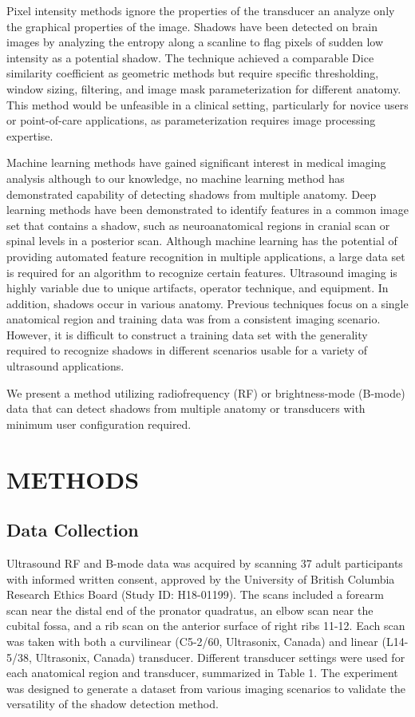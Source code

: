 \documentclass[preprint,5p]{elsarticle}
\begin{document}
Pixel intensity methods ignore the properties of the transducer an analyze only the graphical properties of the image. Shadows have been detected on brain images by analyzing the entropy along a scanline to flag pixels of sudden low intensity as a potential shadow. The technique achieved a comparable Dice similarity coefficient as geometric methods but require specific thresholding, window sizing, filtering, and image mask parameterization for different anatomy. This method would be unfeasible in a clinical setting, particularly for novice users or point-of-care applications, as parameterization requires image processing expertise.

Machine learning methods have gained significant interest in medical imaging analysis although to our knowledge, no machine learning method has demonstrated capability of detecting shadows from multiple anatomy. Deep learning methods have been demonstrated to identify features in a common image set that contains a shadow, such as neuroanatomical regions in cranial scan or spinal levels in a posterior scan. Although machine learning has the potential of providing automated feature recognition in multiple applications, a large data set is required for an algorithm to recognize certain features. Ultrasound imaging is highly variable due to unique artifacts, operator technique, and equipment. In addition, shadows occur in various anatomy. Previous techniques focus on a single anatomical region and training data was from a consistent imaging scenario. However, it is difficult to construct a training data set with the generality required to recognize shadows in different scenarios usable for a variety of ultrasound applications.

We present a method utilizing radiofrequency (RF) or brightness-mode (B-mode) data that can detect shadows from multiple anatomy or transducers with minimum user configuration required. 

\section*{METHODS}
\label{MaM}
     
\subsection*{Data Collection}
Ultrasound RF and B-mode data was acquired by scanning 37 adult participants with informed written consent, approved by the University of British Columbia Research Ethics Board (Study ID: H18-01199). The scans included a forearm scan near the distal end of the pronator quadratus, an elbow scan near the cubital fossa, and a rib scan on the anterior surface of right ribs 11-12. Each scan was taken with both a curvilinear (C5-2/60, Ultrasonix, Canada) and linear (L14-5/38, Ultrasonix, Canada) transducer. Different transducer settings were used for each anatomical region and transducer, summarized in Table 1. The experiment was designed to generate a dataset from various imaging scenarios to validate the versatility of the shadow detection method.
\end{document}
